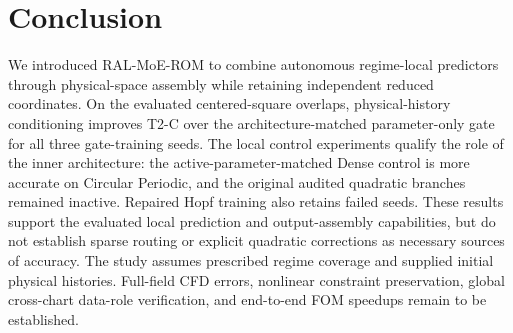 \section{Conclusion}
We introduced RAL-MoE-ROM to combine autonomous regime-local predictors
through physical-space assembly while retaining independent reduced
coordinates. On the evaluated centered-square overlaps, physical-history
conditioning improves T2-C over the architecture-matched parameter-only
gate for all three gate-training seeds. The local control experiments
qualify the role of the inner architecture: the active-parameter-matched
Dense control is more accurate on Circular Periodic, and the original
audited quadratic branches remained inactive. Repaired Hopf training
also retains failed seeds. These results support the evaluated local
prediction and output-assembly capabilities, but do not establish sparse
routing or explicit quadratic corrections as necessary sources of
accuracy. The study assumes prescribed regime coverage and supplied
initial physical histories. Full-field CFD errors, nonlinear
constraint preservation, global cross-chart data-role verification,
and end-to-end FOM speedups remain to be established.
